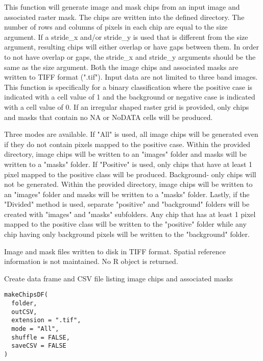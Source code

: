 \documentclass[a4paper]{book}
\begin{document}
%
\begin{Details}\relax
This function will generate image and mask chips from an input image and
associated raster mask. The chips are written into the defined directory.
The number of rows and columns of pixels in each chip are equal to the
size argument. If a stride\_x and/or stride\_y is used that is different from
the size argument, resulting chips will either overlap or have gaps between
them. In order to not have overlap or gaps, the stride\_x and stride\_y arguments
should be the same as the size argument. Both the image chips and associated
masks are written to TIFF format (".tif"). Input data are not limited to three
band images. This function is specifically for a binary classification where
the positive case is indicated with a cell value of 1 and the background or
negative case is indicated with a cell value of 0. If an irregular shaped raster
grid is provided, only chips and masks that contain no NA or NoDATA cells will
be produced.

Three modes are available. If "All" is used, all image chips will be
generated even if they do not contain pixels mapped to the positive case.
Within the provided directory, image chips will be written to an "images" folder
and masks will be written to a "masks" folder. If "Positive" is used, only chips
that have at least 1 pixel mapped to the positive class will be produced. Background-
only chips will not be generated. Within the provided directory, image chips will
be written to an "images" folder and masks will be written to a "masks" folder.
Lastly, if the "Divided" method is used, separate "positive" and "background"
folders will be created with "images" and "masks" subfolders. Any chip that has
at least 1 pixel mapped to the positive class will be written to the "positive"
folder while any chip having only background pixels will be written to the
"background" folder.
\end{Details}
%
\begin{Value}
Image and mask files written to disk in TIFF format. Spatial reference
information is not maintained. No R object is returned.
\end{Value}
%
\begin{Description}\relax
Create data frame and CSV file listing image chips and associated masks
\end{Description}
%
\begin{Usage}
\begin{verbatim}
makeChipsDF(
  folder,
  outCSV,
  extension = ".tif",
  mode = "All",
  shuffle = FALSE,
  saveCSV = FALSE
)
\end{verbatim}
\end{Usage}
\end{document}
